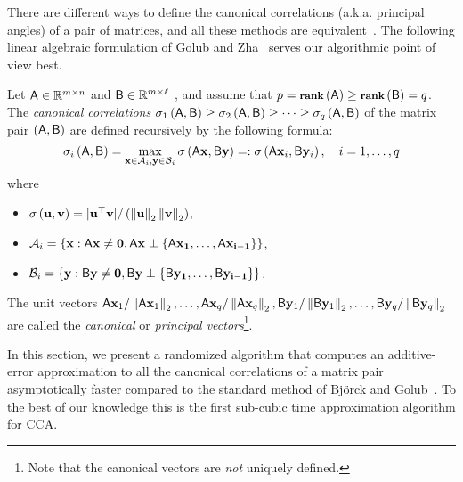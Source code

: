 %
There are different ways to define the canonical correlations (a.k.a. principal angles) of a pair of matrices, and all these methods are equivalent~\cite{GZ95}.
The following linear algebraic formulation of Golub and Zha~\cite{GZ95} serves our algorithmic point of view best.
\begin{definition}\label{def}
Let ${\mathsf{A} } \in \mathbb{R}^{m \times n}$ and ${\mathsf{B} } \in \mathbb{R}^{m \times \ell}$ , and assume that $p = \operatorname{\textbf{{\footnotesize rank}}}\left({\mathsf{A} }\right) \geq \operatorname{\textbf{{\footnotesize rank}}}\left({\mathsf{B} }\right) = q$.
The {\em canonical correlations}  $\sigma_1\left( {\mathsf{A} }, {\mathsf{B} } \right) \ge \sigma_2\left( {\mathsf{A} }, {\mathsf{B} } \right) \ge \cdots \ge \sigma_q\left( {\mathsf{A} }, {\mathsf{B} } \right)$
of the matrix pair $({\mathsf{A} }, {\mathsf{B} })$ are defined recursively by the following formula:
\[ \sigma_i\left({\mathsf{A} }, {\mathsf{B} } \right) = \max_{ \mathbf{x} \in {\cal A}_i, \mathbf{y} \in {\cal B}_i }  \sigma \left( {\mathsf{A} } \mathbf{x}, {\mathsf{B} } \mathbf{y} \right) = : \sigma\left( {\mathsf{A} } \mathbf{x}_i, {\mathsf{B} } \mathbf{y}_i \right)  ,\quad i=1,\ldots ,q\]
where
\begin{itemize}

\item $ \sigma\left({\mathbf u}, {\mathbf v} \right)  = | {\mathbf u}^\top {\mathbf v} | / \left( \left\|{\mathbf u}\right\|_2 \left\|{\mathbf v}\right\|_2 \right)$,

\item $ {\cal A}_i = \{ \mathbf{x} : {\mathsf{A} } \mathbf{x} \neq \bf{0}, {\mathsf{A} } \mathbf{x} \perp \{ {\mathsf{A} } \mathbf{x}_1,\ldots,{\mathsf{A} } \mathbf{x}_{i-1} \} \} $,

\item $ {\cal B}_i = \{ \mathbf{y} : {\mathsf{B} } \mathbf{y} \neq \bf{0}, {\mathsf{B} } \mathbf{y} \perp \{ {\mathsf{B} } \mathbf{y}_1,\ldots,{\mathsf{B} } \mathbf{y}_{i-1} \} \} $.
\end{itemize}
The unit vectors ${\mathsf{A} } \mathbf{x}_1 / \left\|{\mathsf{A} } \mathbf{x}_1\right\|_2, \dots, {\mathsf{A} } \mathbf{x}_q / \left\|{\mathsf{A} } \mathbf{x}_q\right\|_2, {\mathsf{B} } \mathbf{y}_1 / \left\|{\mathsf{B} } \mathbf{y}_1\right\|_2, \dots, {\mathsf{B} } \mathbf{y}_q / \left\|{\mathsf{B} } \mathbf{y}_q\right\|_2$ are called the {\em canonical} or {\em principal vectors}\footnote{Note that the canonical vectors are \emph{not} uniquely defined.}.
\end{definition}
In this section, we present a randomized algorithm that computes an additive-error approximation to all the canonical correlations of a matrix pair asymptotically faster compared to the standard method of Bj{\"o}rck and Golub~\cite{BG73}. To the best of our knowledge this is the first sub-cubic time approximation algorithm for CCA.

